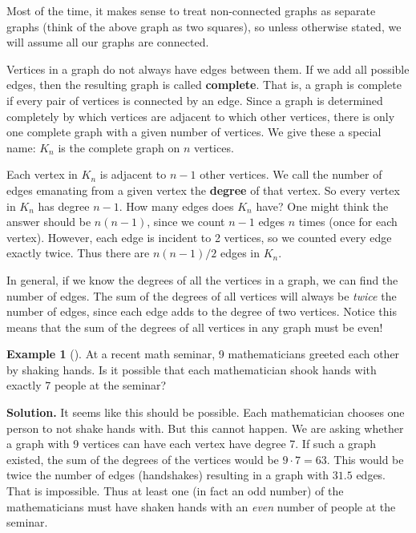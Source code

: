\documentclass[10pt,]{book}
\newcommand{\terminology}[1]{\textbf{#1}}
\theoremstyle{plain}
\theoremstyle{definition}
\theoremstyle{definition}
\newtheorem{example}[theorem]{Example}
\theoremstyle{definition}
\numberwithin{equation}{chapter}
\begin{document}
\par
\hypertarget{p-93}{}%
Most of the time, it makes sense to treat non-connected graphs as separate graphs (think of the above graph as two squares), so unless otherwise stated, we will assume all our graphs are connected.%
\par
\hypertarget{p-94}{}%
Vertices in a graph do not always have edges between them. If we add all possible edges, then the resulting graph is called \terminology{complete}. That is, a graph is complete if every pair of vertices is connected by an edge. Since a graph is determined completely by which vertices are adjacent to which other vertices, there is only one complete graph with a given number of vertices. We give these a special name: \(K_n\)\label{notation-1}
 is the complete graph on \(n\) vertices.%
\par
\hypertarget{p-95}{}%
Each vertex in \(K_n\) is adjacent to \(n-1\) other vertices. We call the number of edges emanating from a given vertex the \terminology{degree} of that vertex. So every vertex in \(K_n\) has degree \(n-1\). How many edges does \(K_n\) have? One might think the answer should be \(n(n-1)\), since we count \(n-1\) edges \(n\) times (once for each vertex). However, each edge is incident to 2 vertices, so we counted every edge exactly twice. Thus there are \(n(n-1)/2\) edges in \(K_n\). %
\par
\hypertarget{p-96}{}%
In general, if we know the degrees of all the vertices in a graph, we can find the number of edges. The sum of the degrees of all vertices will always be \emph{twice} the number of edges, since each edge adds to the degree of two vertices. Notice this means that the sum of the degrees of all vertices in any graph must be even!%
\begin{example}[]\label{example-5}
\hypertarget{p-97}{}%
At a recent math seminar, 9 mathematicians greeted each other by shaking hands. Is it possible that each mathematician shook hands with exactly 7 people at the seminar?%
\par\smallskip%
\noindent\textbf{Solution.}\hypertarget{solution-8}{}\quad%
\hypertarget{p-98}{}%
It seems like this should be possible. Each mathematician chooses one person to not shake hands with. But this cannot happen. We are asking whether a graph with 9 vertices can have each vertex have degree 7. If such a graph existed, the sum of the degrees of the vertices would be \(9\cdot 7 = 63\). This would be twice the number of edges (handshakes) resulting in a graph with \(31.5\) edges. That is impossible. Thus at least one (in fact an odd number) of the mathematicians must have shaken hands with an \emph{even} number of people at the seminar.%
\end{example}
\end{document}
